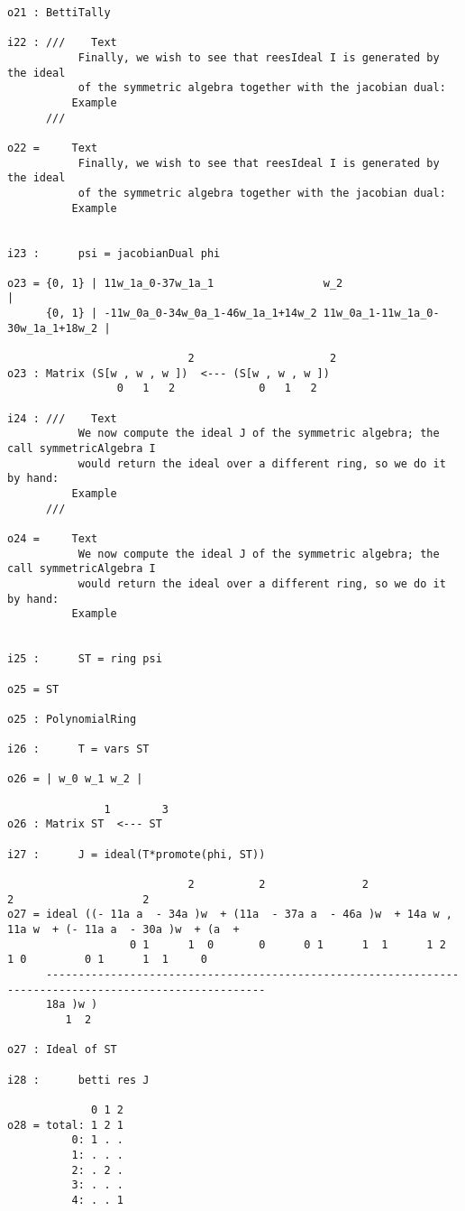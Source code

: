 \documentclass[twoside,12pt, leqno]{amsart}
\begin{document}
\begin{verbatim}
o21 : BettiTally

i22 : ///    Text
           Finally, we wish to see that reesIdeal I is generated by the ideal 
           of the symmetric algebra together with the jacobian dual:
          Example
      ///    

o22 =     Text
           Finally, we wish to see that reesIdeal I is generated by the ideal 
           of the symmetric algebra together with the jacobian dual:
          Example


i23 :      psi = jacobianDual phi

o23 = {0, 1} | 11w_1a_0-37w_1a_1                 w_2                              |
      {0, 1} | -11w_0a_0-34w_0a_1-46w_1a_1+14w_2 11w_0a_1-11w_1a_0-30w_1a_1+18w_2 |

                            2                     2
o23 : Matrix (S[w , w , w ])  <--- (S[w , w , w ])
                 0   1   2             0   1   2

i24 : ///    Text
           We now compute the ideal J of the symmetric algebra; the call symmetricAlgebra I
           would return the ideal over a different ring, so we do it by hand:
          Example
      ///    

o24 =     Text
           We now compute the ideal J of the symmetric algebra; the call symmetricAlgebra I
           would return the ideal over a different ring, so we do it by hand:
          Example


i25 :      ST = ring psi

o25 = ST

o25 : PolynomialRing

i26 :      T = vars ST

o26 = | w_0 w_1 w_2 |

               1        3
o26 : Matrix ST  <--- ST

i27 :      J = ideal(T*promote(phi, ST))

                            2          2               2                 2                    2
o27 = ideal ((- 11a a  - 34a )w  + (11a  - 37a a  - 46a )w  + 14a w , 11a w  + (- 11a a  - 30a )w  + (a  +
                   0 1      1  0       0      0 1      1  1      1 2     1 0         0 1      1  1     0  
      --------------------------------------------------------------------------------------------------------
      18a )w )
         1  2

o27 : Ideal of ST

i28 :      betti res J

             0 1 2
o28 = total: 1 2 1
          0: 1 . .
          1: . . .
          2: . 2 .
          3: . . .
          4: . . 1


\end{verbatim}
\end{document}
